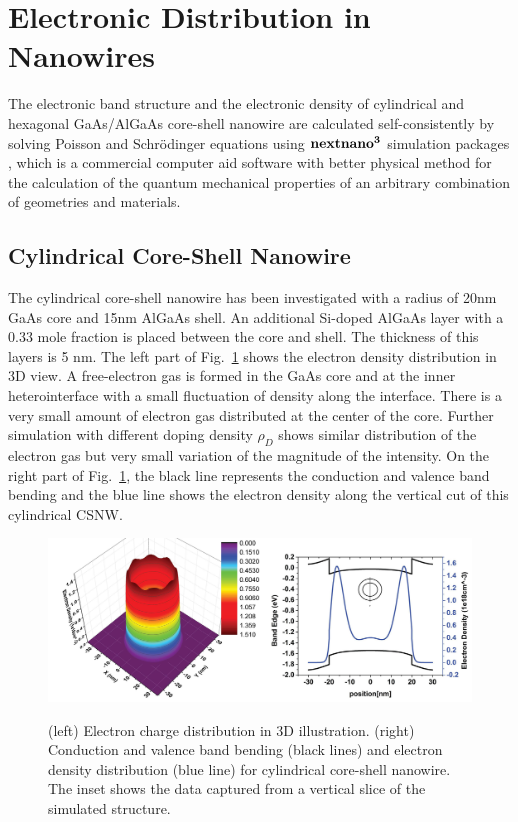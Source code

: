 \section{Electronic Distribution in Nanowires} \label{sec:spectra}

The electronic band structure and the electronic density of cylindrical and
hexagonal GaAs/AlGaAs core-shell nanowire are calculated self-consistently by
solving Poisson and Schr{\"o}dinger equations
\cite{Wong:2011tn,Bertoni:2011hn} using $\bf{nextnano^3}$ simulation
packages \cite{birner2007nextnano}, which is a commercial computer aid software
with better physical method for the calculation of the quantum mechanical
properties of an arbitrary combination of geometries and materials.

\subsection{Cylindrical Core-Shell Nanowire}

The cylindrical core-shell nanowire has been investigated with a radius of 20nm
GaAs core and 15nm AlGaAs shell. An additional Si-doped AlGaAs layer with a
0.33 mole fraction is placed between the core and shell. The thickness of this
layers is 5 nm. The left part of Fig.~\ref{CylindricalCSNW} shows the electron
density distribution in 3D view. A free-electron gas is formed in the GaAs core
and at the inner heterointerface with a small fluctuation of density along the
interface. There is a very small amount of electron gas distributed at the
center of the core. Further simulation with different doping density $\rho_D$
shows similar distribution of the electron gas but very small variation of the
magnitude of the intensity. On the right part of Fig.~\ref{CylindricalCSNW},
the black line represents the conduction and valence band bending and the blue
line shows the electron density along the vertical cut of this cylindrical
CSNW.

\begin{figure}
  \caption{(left) Electron charge distribution in 3D illustration. (right) Conduction and valence band bending (black lines) and electron density distribution (blue line) for cylindrical core-shell nanowire. The inset shows the data captured from a vertical slice of the simulated structure.}
  \centering
  \includegraphics[width=\textwidth]{pictures/ED/CylindricalCSNW}
  \label{CylindricalCSNW}
\end{figure}

